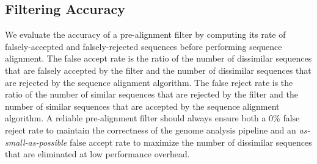 {%

\subsection{Filtering Accuracy}\label{filtering_accuracy}
We evaluate the accuracy of {a} pre-alignment filter by computing its rate of falsely-accepted and falsely-rejected sequences before performing sequence alignment. The false accept rate is the ratio of the number of dissimilar sequences that are falsely accepted by the filter and the number of dissimilar sequences that are rejected by the sequence alignment algorithm. 
The false reject rate is the ratio of the number of similar sequences that are rejected by the filter and the number of similar sequences that are accepted by the sequence alignment algorithm. A reliable pre-alignment filter should always ensure both a 0\% false reject rate {to maintain the correctness of {the} genome analysis pipeline and an \emph{as-small-as-possible}} false accept rate  {to} maximize the number of dissimilar sequences that are eliminated {at low performance overhead}.

}
